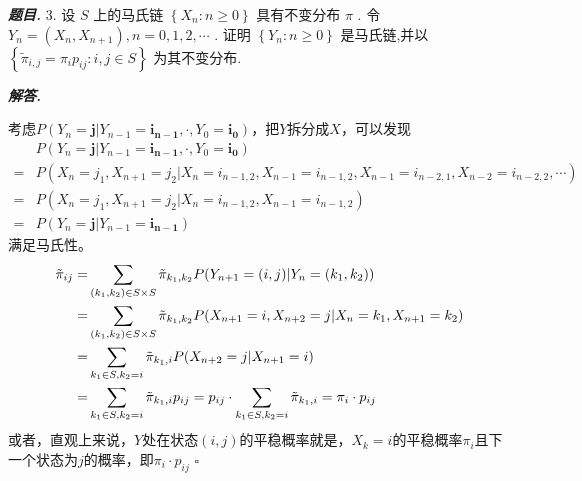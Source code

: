 \documentclass[10pt, a4paper, oneside]{ctexart}
\newenvironment{problem}{\begin{framed}\par\noindent\textbf{\textit{题目. }}}{\end{framed}\par}
\newenvironment{solution}{%
  \par\noindent\textbf{\textit{解答. }}\ignorespaces
}{%
  \hfill\ensuremath{\square}\par %
}
\begin{document}
\begin{problem}
3. 设 \( S \) 上的马氏链 \( \left\{  {{X}_{n} : n \geq  0}\right\}   \) 具有不变分布 \( \pi  \) . 令 \( {Y}_{n} = \left( {{X}_{n},{X}_{n + 1}}\right) ,n = 0,1,2,\cdots  \) .  证明 \( \left\{  {{Y}_{n} : n \geq  0}\right\}   \) 是马氏链,并以 \( \left\{  {{\widetilde{\pi }}_{i,j} = {\pi }_{i}{p}_{ij} : i,j \in  S}\right\}   \) 为其不变分布.
\end{problem}
\begin{solution}
考虑$P(Y_n=\bm{j}|Y_{n-1}=\bm{i_{n-1}},\cdot,Y_{0}=\bm{i_0})$，把$Y$拆分成$X$，可以发现
\begin{align*}
&P(Y_n=\bm{j}|Y_{n-1}=\bm{i_{n-1}},\cdot,Y_{0}=\bm{i_0})\\
=&P(X_{n}=j_1,X_{n+1}=j_2|X_{n}=i_{n-1,2},X_{n-1}=i_{n-1,2},X_{n-1}=i_{n-2,1},X_{n-2}=i_{n-2,2},\cdots)\\
=&P(X_{n}=j_1,X_{n+1}=j_2|X_{n}=i_{n-1,2},X_{n-1}=i_{n-1,2})\\
=&P(Y_n=\bm{j}|Y_{n-1}=\bm{i_{n-1}})
\end{align*}
满足马氏性。
\begin{align*}
    \Tilde{\pi}_{ij}=&\sum_{(k_1,k_2)\in S\times S} \Tilde{\pi}_{k_1,k_2}P(Y_{n+1}=(i,j)|Y_{n}=(k_1,k_2))\\
    =&\sum_{(k_1,k_2)\in S\times S} \Tilde{\pi}_{k_1,k_2}P(X_{n+1}=i,X_{n+2}=j| X_{n}=k_1,X_{n+1}=k_2)\\
    =&\sum_{k_1\in S, k_2=i} \Tilde{\pi}_{k_1, i}P(X_{n+2}=j|X_{n+1}=i)\\
    =&\sum_{k_1\in S, k_2=i} \Tilde{\pi}_{k_1, i}p_{ij}=p_{ij}\cdot\sum_{k_1\in S, k_2=i} \Tilde{\pi}_{k_1, i}=\pi_i\cdot p_{ij}
\end{align*}
或者，直观上来说，$Y$处在状态$(i,j)$的平稳概率就是，$X_k=i$的平稳概率$\pi_i$且下一个状态为$j$的概率，即$\pi_i\cdot p_{ij}$
\end{solution}
\end{document}
